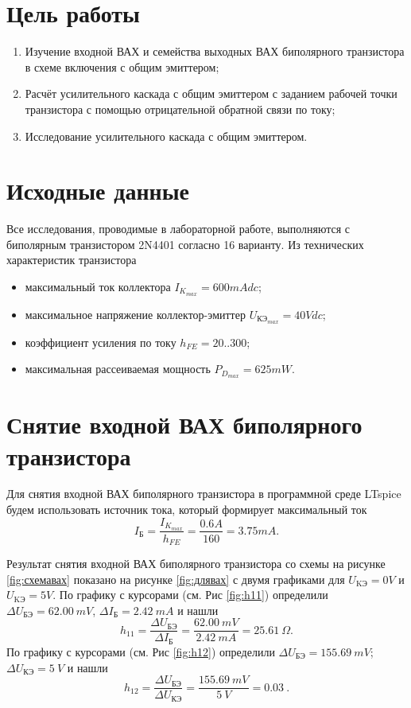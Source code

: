 \section*{Цель работы}

\begin{enumerate}
    \item Изучение входной ВАХ и семейства выходных ВАХ биполярного 
    транзистора в схеме включения с общим эмиттером;
    \item Расчёт усилительного каскада с общим эмиттером с заданием
    рабочей точки транзистора с помощью отрицательной
    обратной связи по току;
    \item Исследование усилительного каскада с общим эмиттером.
\end{enumerate}



\section*{Исходные данные}

Все исследования, проводимые в лабораторной работе, выполняются с 
биполярным транзистором 2N4401 согласно 16 варианту.
Из технических характеристик транзистора
\begin{itemize}
    \item максимальный ток коллектора $I_{K_{max}}=600mAdc$;
    \item максимальное напряжение коллектор-эмиттер $U_\text{КЭ$_{max}$}=40Vdc$;
    \item коэффициент усиления по току $h_{FE}=20..300$;
    \item максимальная рассеиваемая мощность $P_{D_{max}}=625mW$.
\end{itemize}


\section*{Снятие входной ВАХ биполярного транзистора}

Для снятия входной ВАХ биполярного транзистора в
программной среде LTspice будем использовать источник тока,
который формирует максимальный ток 
$$
I_\text{Б}=\frac{I_{K_{max}}}{h_{FE}}=\frac{0.6A}{160}=3.75mA.
$$

Результат снятия входной ВАХ биполярного транзистора со схемы на
рисунке \ref{fig:схемавах} показано на рисунке \ref{fig:длявах} с двумя
графиками для $U_\text{KЭ}=0V$ и $U_\text{KЭ}=5V$.
По графику с курсорами (см. Рис \ref{fig:h11}) определили $\Delta U_\text{БЭ}=62.00\ mV$, $\Delta I_\text{Б}=2.42\ mA$ и нашли
\begin{equation*}
    h_{11}=\frac{\Delta U_\text{БЭ}}{\Delta I_\text{Б}}=\frac{62.00\ mV}{2.42\ mA}=25.61\ \Omega.
\end{equation*}
По графику с курсорами (см. Рис \ref{fig:h12}) определили $\Delta U_\text{БЭ}=155.69\ mV$; $\Delta U_\text{КЭ}=5\ V$ и нашли
\begin{equation*}
    h_{12}=\frac{\Delta U_\text{БЭ}}{\Delta U_\text{КЭ}}=\frac{155.69\ mV}{5\ V}=0.03\ .
\end{equation*}



